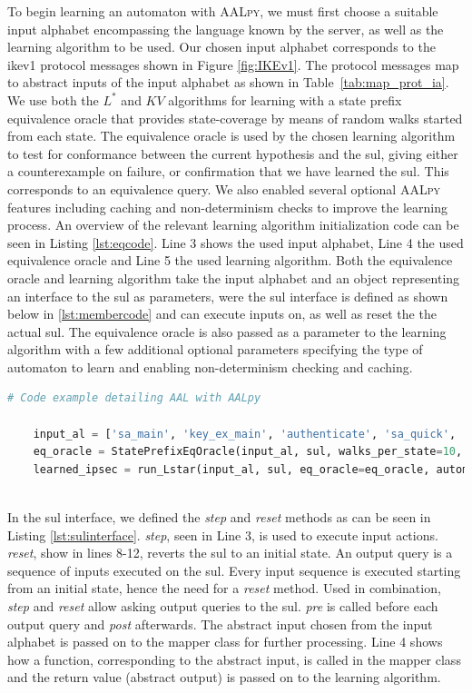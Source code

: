 To begin learning an automaton with \textsc{AALpy}, we must first choose a suitable input alphabet encompassing the language known by the server, as well as the learning algorithm to be used. Our chosen input alphabet corresponds to the \ac{ike}v1 protocol messages shown in Figure \ref{fig:IKEv1}. The protocol messages map to abstract inputs of the input alphabet as shown in Table~\ref{tab:map_prot_ia}. We use both the $L^*$ and $KV$ algorithms for learning with a state prefix equivalence oracle that provides state-coverage by means of random walks started from each state. The equivalence oracle is used by the chosen learning algorithm to test for conformance between the current hypothesis and the \ac{sul}, giving either a counterexample on failure, or confirmation that we have learned the \ac{sul}. This corresponds to an equivalence query. We also enabled several optional \textsc{AALpy} features including caching and non-determinism checks to improve the learning process. An overview of the relevant learning algorithm initialization code can be seen in Listing \ref{lst:eqcode}. Line 3 shows the used input alphabet, Line 4 the used equivalence oracle and Line 5 the used learning algorithm. Both the equivalence oracle and learning algorithm take the input alphabet and an object representing an interface to the \ac{sul} as parameters, were the \ac{sul} interface is defined as shown below in \ref{lst:membercode} and can execute inputs on, as well as reset the the actual \ac{sul}. The equivalence oracle is also passed as a parameter to the learning algorithm with a few additional optional parameters specifying the type of automaton to learn and enabling non-determinism checking and caching.

\begin{lstlisting}[float=h, caption=Equivalence Query code, label=lst:eqcode, language=python]
	# Code example detailing AAL with AALpy
	
	input_al = ['sa_main', 'key_ex_main', 'authenticate', 'sa_quick', 'ack_quick']
	eq_oracle = StatePrefixEqOracle(input_al, sul, walks_per_state=10, walk_len=10)
	learned_ipsec = run_Lstar(input_al, sul, eq_oracle=eq_oracle, automaton_type='mealy', cache_and_non_det_check=True)
	
\end{lstlisting}

In the \ac{sul} interface, we defined the \emph{step} and \emph{reset} methods as can be seen in Listing \ref{lst:sulinterface}. \emph{step}, seen in Line 3, is used to execute input actions. \emph{reset}, show in lines 8-12, reverts the \ac{sul} to an initial state. An output query is a sequence of inputs executed on the \ac{sul}. Every input sequence is executed starting from an initial state, hence the need for a \emph{reset} method. Used in combination, \emph{step} and \emph{reset} allow asking output queries to the \ac{sul}. \emph{pre} is called before each output query and \emph{post} afterwards. The abstract input chosen from the input alphabet is passed on to the mapper class for further processing. Line 4 shows how a function, corresponding to the abstract input, is called in the mapper class and the return value (abstract output) is passed on to the learning algorithm. \\

